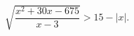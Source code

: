\begin{ex}[type=inequality]
	\begin{condition}
		$ \sqrt{\dfrac{x^2 + 30x - 675}{x - 3}}>15-\big|x\big|.$
	\end{condition}
\end{ex}